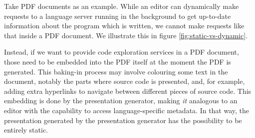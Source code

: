 Take PDF documents as an example.
While an editor can dynamically make requests to a language server running in the background to get up-to-date information about the program which is written,
we cannot make requests like that inside a PDF document.
We illustrate this in figure \cref{fig:static-vs-dynamic}.

Instead, if we want to provide code exploration services in a PDF document, those need to be embedded into the PDF itself at the moment the PDF is generated.
This baking-in process may involve colouring some text in the document, notably the parts where source code is presented,
and, for example, adding extra hyperlinks to navigate between different pieces of source code.
This embedding is done by the presentation generator, making \emph{it} analogous to an editor with the capability to access language-specific metadata.
In that way, the presentation generated by the presentation generator has the possibility to be entirely static.

